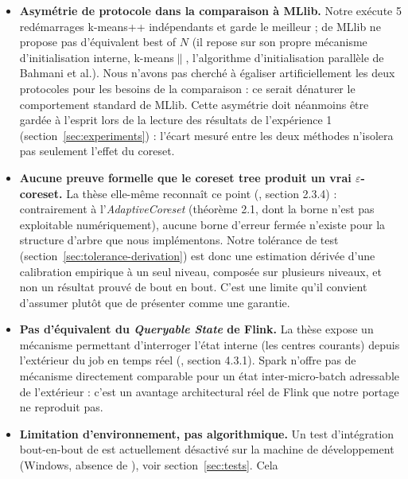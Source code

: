 \begin{itemize}
  \item \textbf{Asymétrie de protocole dans la comparaison à MLlib.} Notre
         exécute 5 redémarrages k-means++ indépendants et
        garde le meilleur ;  de MLlib ne propose
        pas d'équivalent \og best of $N$\fg{} (il repose sur son propre
        mécanisme d'initialisation interne, k-means$\|$, l'algorithme
        d'initialisation parallèle de Bahmani et al.). Nous n'avons pas
        cherché à égaliser artificiellement les deux protocoles pour les
        besoins de la comparaison : ce serait dénaturer le comportement
        standard de MLlib. Cette asymétrie doit néanmoins être gardée à
        l'esprit lors de la lecture des résultats de l'expérience 1
        (section~\ref{sec:experiments}) : l'écart mesuré entre les deux
        méthodes n'isolera pas seulement l'effet du coreset.
  \item \textbf{Aucune preuve formelle que le coreset tree produit un vrai
        $\varepsilon$-coreset.} La thèse elle-même reconnaît ce point
        (\cite{bitsakis2018}, section 2.3.4) : contrairement à
        l'\emph{AdaptiveCoreset} (théorème 2.1, dont la borne n'est pas
        exploitable numériquement), aucune borne d'erreur fermée n'existe
        pour la structure d'arbre que nous implémentons. Notre tolérance de
        test (section~\ref{sec:tolerance-derivation}) est donc une
        estimation dérivée d'une calibration empirique à un seul niveau,
        composée sur plusieurs niveaux, et non un résultat prouvé de bout en
        bout. C'est une limite qu'il convient d'assumer plutôt que de
        présenter comme une garantie.
  \item \textbf{Pas d'équivalent du \emph{Queryable State} de Flink.} La
        thèse expose un mécanisme permettant d'interroger l'état interne
        (les centres courants) depuis l'extérieur du job en temps réel
        (\cite{bitsakis2018}, section 4.3.1). Spark n'offre pas de mécanisme
        directement comparable pour un état inter-micro-batch adressable de
        l'extérieur : c'est un avantage architectural réel de Flink que
        notre portage ne reproduit pas.
  \item \textbf{Limitation d'environnement, pas algorithmique.} Un test
        d'intégration bout-en-bout de  est
        actuellement désactivé sur la machine de développement (Windows,
        absence de ), voir section~\ref{sec:tests}. Cela

\end{itemize}
